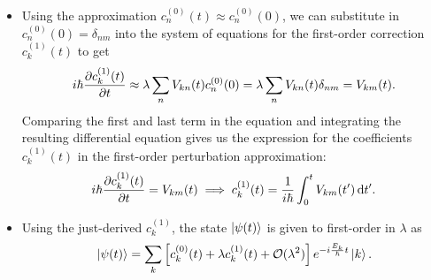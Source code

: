 \documentclass[11pt, a4paper]{article}
\newcommand{\diff}{\mathop{}\!\mathrm{d}} %
\begin{document}
\begin{itemize}
    \item Using the approximation $ c_{n}^{(0)}(t) \approx c_{n}^{(0)}(0) $, we can substitute in $ c_{n}^{(0)}(0) = \delta_{nm} $ into the system of equations for the first-order correction $ c_{k}^{(1)}(t) $ to get
    \begin{equation*}
        i \hbar \pdv{c_{k}^{(1)}(t)}{t} \approx \lambda \sum_{n} V_{kn}(t) c_{n}^{(0)}(0) = \lambda \sum_{n} V_{kn}(t) \delta_{nm} = V_{km}(t).
    \end{equation*}
    Comparing the first and last term in the equation and integrating the resulting differential equation gives us the expression for the coefficients $ c_{k}^{(1)}(t) $ in the first-order perturbation approximation:
    \begin{equation*}
        i \hbar \pdv{c_{k}^{(1)}(t)}{t} = V_{km}(t) \implies c_{k}^{(1)}(t) = \frac{1}{i \hbar} \int_{0}^{t}V_{km}(t')\diff t'.
    \end{equation*}
    
    \item Using the just-derived $ c_{k}^{(1)} $, the state $ \ket{\psi(t)} $ is given to first-order in $ \lambda $ as
    \begin{equation*}
        \ket{\psi(t)} = \sum_{k}\left[ c_{k}^{(0)}(t) + \lambda c_{k}^{(1)}(t) + \mathcal{O}(\lambda^{2})\right]e^{-i \frac{E_{k}}{\hbar}t}\ket{k}.
    \end{equation*}
    
    
\end{itemize}
\end{document}
